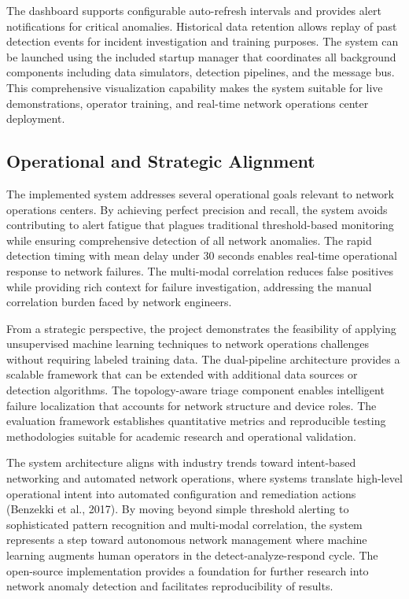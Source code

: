\documentclass[11pt]{article}
\begin{document}
The dashboard supports configurable auto-refresh intervals and provides alert notifications for critical anomalies. Historical data retention allows replay of past detection events for incident investigation and training purposes. The system can be launched using the included startup manager that coordinates all background components including data simulators, detection pipelines, and the message bus. This comprehensive visualization capability makes the system suitable for live demonstrations, operator training, and real-time network operations center deployment.

\subsection{Operational and Strategic Alignment}

The implemented system addresses several operational goals relevant to network operations centers. By achieving perfect precision and recall, the system avoids contributing to alert fatigue that plagues traditional threshold-based monitoring while ensuring comprehensive detection of all network anomalies. The rapid detection timing with mean delay under 30 seconds enables real-time operational response to network failures. The multi-modal correlation reduces false positives while providing rich context for failure investigation, addressing the manual correlation burden faced by network engineers.

From a strategic perspective, the project demonstrates the feasibility of applying unsupervised machine learning techniques to network operations challenges without requiring labeled training data. The dual-pipeline architecture provides a scalable framework that can be extended with additional data sources or detection algorithms. The topology-aware triage component enables intelligent failure localization that accounts for network structure and device roles. The evaluation framework establishes quantitative metrics and reproducible testing methodologies suitable for academic research and operational validation.

The system architecture aligns with industry trends toward intent-based networking and automated network operations, where systems translate high-level operational intent into automated configuration and remediation actions (Benzekki et al., 2017). By moving beyond simple threshold alerting to sophisticated pattern recognition and multi-modal correlation, the system represents a step toward autonomous network management where machine learning augments human operators in the detect-analyze-respond cycle. The open-source implementation provides a foundation for further research into network anomaly detection and facilitates reproducibility of results.
\end{document}
